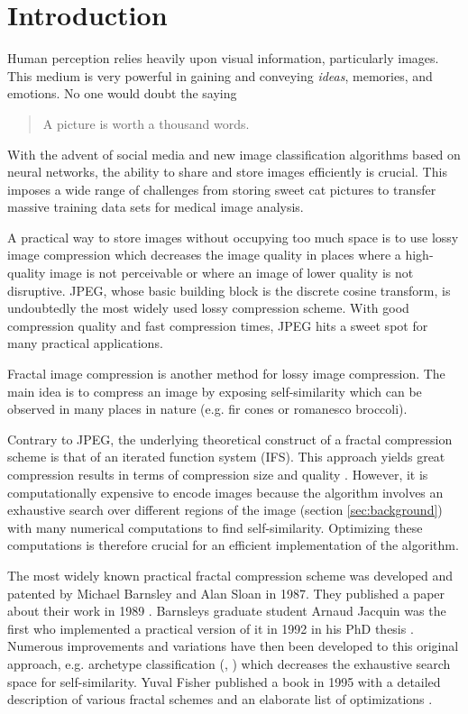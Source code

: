 \section{Introduction}\label{sec:intro}
Human perception relies heavily upon visual information, particularly images.
This medium is very powerful in gaining and conveying \textit{ideas}, memories,
and emotions. No one would doubt the saying
\begin{quote}
A picture is worth a thousand words.
\end{quote}
With the advent of social media and new image classification algorithms based on
neural networks, the ability to share and store images efficiently is crucial.
This imposes a wide range of challenges from storing sweet cat pictures to
transfer massive training data sets for medical image analysis.


A practical way to store images without occupying too much space is to use lossy
image compression which decreases the image quality in places where a
high-quality image is not perceivable or where an image of lower quality is not
disruptive. JPEG, whose basic building block is the discrete cosine transform,
is undoubtedly the most widely used lossy compression scheme. With good
compression quality and fast compression times, JPEG hits a sweet spot for many
practical applications.

Fractal image compression is another method for lossy image compression. The
main idea is to compress an image by exposing self-similarity which can be
observed in many places in nature (e.g. fir cones or romanesco broccoli).

Contrary to JPEG, the underlying theoretical construct of a fractal compression
scheme is that of an iterated function system (IFS). This approach yields great
compression results in terms of compression size and quality \cite{fisher2012}.
However, it is computationally expensive to encode images because the algorithm
involves an exhaustive search over different regions of the image (section
\ref{sec:background}) with many numerical computations to find self-similarity.
Optimizing these computations is therefore crucial for an efficient
implementation of the algorithm.

 The most widely known practical fractal compression scheme
was developed and patented by Michael Barnsley and Alan Sloan in 1987. They
published a paper about their work in 1989 \cite{barnsley1989fractal}. Barnsleys
graduate student Arnaud Jacquin was the first who implemented a practical
version of it in 1992 in his PhD thesis \cite{jacquin1990fractal}. Numerous
improvements and variations have then been developed to this original approach,
e.g. archetype classification (\cite{jacobs1992image}, \cite{boss1991studies})
which decreases the exhaustive search space for self-similarity. Yuval Fisher
published a book in 1995 with a detailed description of various fractal schemes
and an elaborate list of optimizations \cite{fisher2012}.

